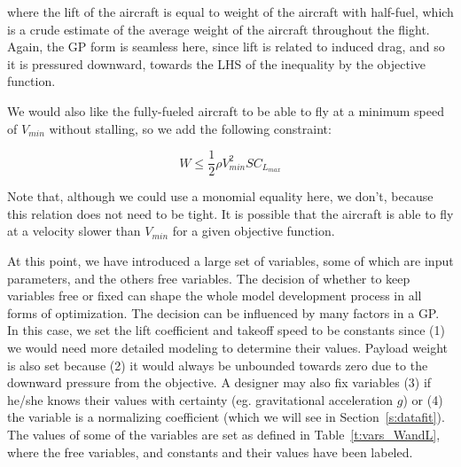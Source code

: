 where the lift of the aircraft is equal to weight of the aircraft with half-fuel, 
which is a crude estimate of the average weight of the aircraft throughout the flight.
Again, the \gls{GP} form is seamless here, since lift is related to
induced drag, and so it is pressured downward, towards the \gls{LHS}
of the inequality by the objective function.

We would also like the fully-fueled aircraft to be able to fly at a minimum speed 
of $V_{min}$ without stalling, so we add the following constraint:

\begin{equation}
    W \leq \frac{1}{2} \rho V_{min}^2 S C_{L_{max}}
\end{equation}

Note that, although we could use a monomial equality here, we don't, because this
relation does not need to be tight. It is possible that the aircraft is able to
fly at a velocity slower than $V_{min}$ for a given objective function.

At this point, we have introduced a large set of variables, some of which are input
parameters, and the others free variables. The decision of whether to keep variables free or fixed
can shape the whole model development process in all forms of optimization.
The decision can be influenced by many
factors in a \gls{GP}. In this case, we set the lift coefficient and takeoff speed
to be constants since (1) we would need
more detailed modeling to determine their values. Payload weight is also set
because (2) it would always be unbounded towards zero due to the downward pressure from
the objective. A designer may also fix variables (3) if he/she knows their values with
certainty (eg. gravitational acceleration $g$) or (4) the variable is a normalizing
coefficient (which we will see in Section~\ref{s:datafit}). The values
of some of the variables are set as defined in Table~\ref{t:vars_WandL}, where the free variables,
and constants and their values have been labeled.

